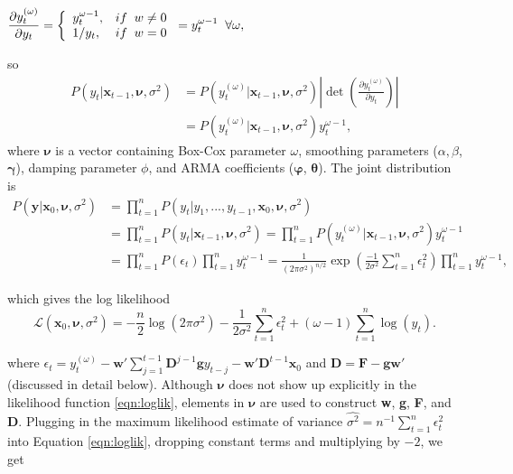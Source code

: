 \documentclass{uwstat572}
\begin{document}
\begin{center}
$\displaystyle \frac{\partial y_t^{(\omega)}}{ \partial  y_t }= \left\{
\begin{array}{l l}
y_t^{\omega-1}, & if \;\; w \neq 0\\
1/ y_t, & if\;\; w=0\\
\end{array} \right. =y_t^{\omega-1}\;\;  \forall \omega,$ 
\end{center}
so
\begin{align*}
\displaystyle P(y_t| \textbf{x}_{t-1}, \bm{\nu},\sigma^2)&=P(y_t^{(\omega)}| \textbf{x}_{t-1}, \bm{\nu},\sigma^2) \left| \det\left( \frac{\partial y_t^{(\omega)}}{ \partial  y_t }   \right) \right| \\
&= P(y_t^{(\omega)}| \textbf{x}_{t-1}, \bm{\nu},\sigma^2) y_t^{\omega-1},
\end{align*}
where $\bm{\nu}$ is a vector containing Box-Cox parameter $\omega$, smoothing parameters ($\alpha,\beta$, $\bm{\gamma}$), damping parameter $\phi$, and ARMA coefficients ($\bm{\varphi}$, $\bm{\theta}$). The joint distribution is
\begin{align*}
\displaystyle P(\textbf{y}| \textbf{x}_0, \bm{\nu},\sigma^2)&= \prod\limits_{t=1}^n P(y_t|y_1,...,y_{t-1},\textbf{x}_0, \bm{\nu},\sigma^2) \\
&= \displaystyle   \prod\limits_{t=1}^n P(y_t|\textbf{x}_{t-1}, \bm{\nu},\sigma^2)
= \displaystyle   \prod\limits_{t=1}^n  P(y_t^{(\omega)}| \textbf{x}_{t-1}, \bm{\nu},\sigma^2) y_t^{\omega-1} \\
&=\displaystyle   \prod\limits_{t=1}^n P(\epsilon_t)  \prod\limits_{t=1}^n y_t^{\omega-1}
=\displaystyle \frac{1}{(2\pi \sigma^2)^{n/2}} \exp \left(  \frac{-1}{2\sigma^2}  \sum\limits_{t=1}^n \epsilon_t^2 \right)   \prod\limits_{t=1}^n y_t^{\omega-1},
\end{align*}

\noindent which gives the log likelihood
\begin{equation}
\mathcal{L}(\textbf{x}_0, \bm{\nu},\sigma^2)=-\frac{n}{2} \log (2\pi \sigma^2) -\frac{1}{2\sigma^2} \sum\limits_{t=1}^n \epsilon_t^2 +(\omega-1) \sum\limits_{t=1}^n \log(y_t).
\label{eqn:loglik}
\end{equation}

\noindent where $\epsilon_t=y_t^{(\omega)}-\textbf{w}' \sum\limits_{j=1}^{t-1} \textbf{D}^{j -1}\textbf{g} y_{t-j} -\textbf{w}' \textbf{D}^{t-1} \textbf{x}_0$ and $\textbf{D}=\textbf{F}-\textbf{g} \textbf{w}'$ (discussed in detail below). Although $\bm{\nu}$ does not show up explicitly in the likelihood function \ref{eqn:loglik}, elements in $\bm{\nu}$ are used to construct \textbf{w}, \textbf{g}, \textbf{F}, and \textbf{D}. Plugging in the maximum likelihood estimate of variance $\hat{\sigma^2}=n^{-1} \sum\limits_{t=1}^n \epsilon_t^2$ into Equation \ref{eqn:loglik}, dropping constant terms and multiplying by $-2$, we get
\end{document}
